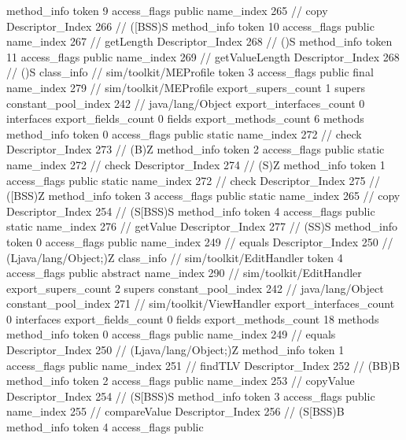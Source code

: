 {{{{				method_info {
					token	9
					access_flags	public
					name_index	265		// copy
					Descriptor_Index	266		// ([BSS)S
				}
				method_info {
					token	10
					access_flags	public
					name_index	267		// getLength
					Descriptor_Index	268		// ()S
				}
				method_info {
					token	11
					access_flags	public
					name_index	269		// getValueLength
					Descriptor_Index	268		// ()S
				}
			}
		}
		class_info {		// sim/toolkit/MEProfile
			token	3
			access_flags	public final
			name_index	279		// sim/toolkit/MEProfile
			export_supers_count	1
			supers {
				constant_pool_index	242		// java/lang/Object
			}
			export_interfaces_count	0
			interfaces {
			}
			export_fields_count	0
			fields {
			}
			export_methods_count	6
			methods {
				method_info {
					token	0
					access_flags	public static
					name_index	272		// check
					Descriptor_Index	273		// (B)Z
				}
				method_info {
					token	2
					access_flags	public static
					name_index	272		// check
					Descriptor_Index	274		// (S)Z
				}
				method_info {
					token	1
					access_flags	public static
					name_index	272		// check
					Descriptor_Index	275		// ([BSS)Z
				}
				method_info {
					token	3
					access_flags	public static
					name_index	265		// copy
					Descriptor_Index	254		// (S[BSS)S
				}
				method_info {
					token	4
					access_flags	public static
					name_index	276		// getValue
					Descriptor_Index	277		// (SS)S
				}
				method_info {
					token	0
					access_flags	public
					name_index	249		// equals
					Descriptor_Index	250		// (Ljava/lang/Object;)Z
				}
			}
		}
		class_info {		// sim/toolkit/EditHandler
			token	4
			access_flags	public abstract
			name_index	290		// sim/toolkit/EditHandler
			export_supers_count	2
			supers {
				constant_pool_index	242		// java/lang/Object
				constant_pool_index	271		// sim/toolkit/ViewHandler
			}
			export_interfaces_count	0
			interfaces {
			}
			export_fields_count	0
			fields {
			}
			export_methods_count	18
			methods {
				method_info {
					token	0
					access_flags	public
					name_index	249		// equals
					Descriptor_Index	250		// (Ljava/lang/Object;)Z
				}
				method_info {
					token	1
					access_flags	public
					name_index	251		// findTLV
					Descriptor_Index	252		// (BB)B
				}
				method_info {
					token	2
					access_flags	public
					name_index	253		// copyValue
					Descriptor_Index	254		// (S[BSS)S
				}
				method_info {
					token	3
					access_flags	public
					name_index	255		// compareValue
					Descriptor_Index	256		// (S[BSS)B
				}
				method_info {
					token	4
					access_flags	public
}}}}}
